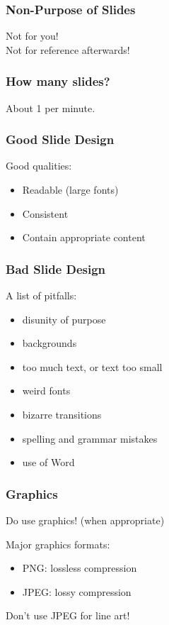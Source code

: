 \documentclass{beamer}
\begin{document}
\begin{frame}
\frametitle{Non-Purpose of Slides}

\Large
Not for you!\\[1em]

Not for reference afterwards!
\end{frame}

\begin{frame}
\frametitle{How many slides?}

\Large
\begin{center}
About 1 per minute.
\end{center}

\end{frame}

\begin{frame}

\frametitle{Good Slide Design}

Good qualities:
\begin{itemize}
\item Readable (large fonts)
\item Consistent
\item Contain appropriate content
\end{itemize}

\end{frame}

\begin{frame}

\frametitle{Bad Slide Design}

A list of pitfalls:
\begin{itemize}
\item disunity of purpose
\item backgrounds
\item too much text, or text too small
\item weird fonts
\item bizarre transitions
\item spelling and grammar mistakes
\item use of Word
\end{itemize}

\end{frame}

\begin{frame}

\frametitle{Graphics}

\begin{center}
Do use graphics! (when appropriate)
\end{center}

Major graphics formats:

\begin{itemize}
\item PNG: lossless compression
\item JPEG: lossy compression
\end{itemize}

\alert{Don't use JPEG for line art!}

\end{frame}
\end{document}
